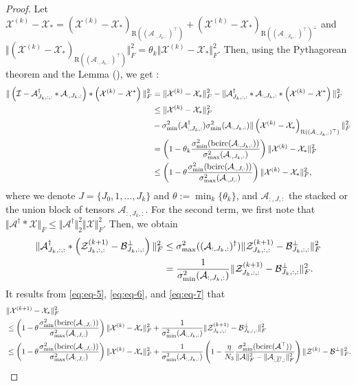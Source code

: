 \documentclass[11pt]{article}
\def\fm#1{\mathcal{#1}}
\def \a#1{\fm A_{:, #1, :}}
\def \ai#1{\fm A_{#1, :, :}}
\def \z#1#2{\fm Z^{(#1)}_{#2, :, :}}
\def \bp#1{\fm B^{\perp}_{#1, :, :}}
\def \x#1{\fm X^{(#1)}}
\begin{document}
\begin{proof}
Let  $\x{k}-\fm X_\ast = \left( \x{k} - \fm X_\ast \right)_{\text{R}((\a{J_k})^\top)} + \left(\x k - \fm X_\ast \right)_{\text{R}((\a{J_k})^\top)^\perp }$ and $\Vert \left( \x{k} - \fm X_\ast \right)_{\text{R}((\a{J_k})^\top)} \Vert_F^2  = \theta_k \Vert \x k - \fm X_\ast \Vert_F^2$. Then, using the Pythagorean theorem and the  Lemma (), we get :
\begin{align}
\Vert \left( \fm I - \ai{J_k}^\dagger *  \a{J_k} \right) *\left(\x k - \fm X^\ast   \right) \Vert_F^2  & = \Vert \x k - \fm X_\ast \Vert_F^2 - \Vert  \ai{J_k}^\dagger *  \a{J_k}  *\left(\x k - \fm X^\ast   \right) \Vert_F^2  \notag\\
& \leq  \Vert \x k - \fm X_\ast \Vert_F^2  \notag\\
& -\sigma_{\min}^2(\a{J_k}^\dagger) \sigma_{\min}^2(\a{J_k}) \Vert\left( \x{k} - \fm X_\ast \right)_{\text{R}((\a{J_k})^\top)} \Vert_F^2 \notag\\
& = \left( 1 - \theta_k \frac{\sigma_{\min}^2(\bcirc(\a{J_k}))}{\sigma^2_{\max}(\a{J_k})}\right) \Vert \x k - \fm X_\ast \Vert_F^2 \notag  \\
& \leq \left( 1 - \theta \frac{\sigma_{\min}^2(\bcirc(\a{J}))}{\sigma^2_{\max}(\a{J})}\right) \Vert \x k - \fm X_\ast \Vert_F^2 \label{eq:eq-6}, 
\end{align}
where we denote $J = \{J_0, 1, \ldots, J_k \}$ and $\theta:= \min_{k} \{\theta_k \}$, and $\a{J}$ the stacked or the union block of tensors  $\a{J_k}$. For the second term,  we first note that $\Vert \fm A^\dagger * \fm X \Vert_F \leq \Vert \fm A ^\dagger \Vert_2^2 \Vert \fm X \Vert_F^2$. Then, we obtain
\begin{align}
  \Vert  \ai{J_k}^\dagger* \left(\z{k+1}{J_k} - \bp{J_k}  \right) \Vert_F^2  & \leq \sigma_{\max}^2((\a{J_k})^\dagger) \Vert  \z{k+1}{J_k} - \bp{J_k} \Vert_F^2 \notag\\
  & = \frac{1}{\sigma_{\min}^2(\a{J_k})} \Vert  \z{k+1}{J_k} - \bp{J_k} \Vert_F^2.
  \label{eq:eq-7}
\end{align}
It results from  \eqref{eq:eq-5}, \eqref{eq:eq-6}, and \eqref{eq:eq-7} that
\begin{align*}
 & \Vert \x{k+1} - \fm X_\ast \Vert_F^2 \\
 &  \leq \left( 1 - \theta \frac{\sigma_{\min}^2(\bcirc(\a{J}))}{\sigma^2_{\max}(\a{J})}\right) \Vert \x k - \fm X_\ast \Vert_F^2 +  \frac{1}{\sigma_{\min}^2(\a{J_k})} \Vert  \z{k+1}{J_k} - \bp{J_k} \Vert_F^2\\
 & \leq \left( 1 - \theta \frac{\sigma_{\min}^2(\bcirc(\a{J}))}{\sigma^2_{\max}(\a{J})}\right) \Vert \x k - \fm X_\ast \Vert_F^2 + \frac{1}{\sigma_{\min}^2(\a{J_k})} \left( 1 - \frac{\eta}{N_3}  \frac{\sigma_{\min}^2(\bcirc(\fm A^\top))}{\Vert \fm A \Vert_F^2 - \Vert \a{\overline{U}} \Vert_F^2}   \right) \Vert  \fm Z^{(k)} - \fm B^\perp \Vert_F^2 .

\end{align*}
\end{proof}
\end{document}
